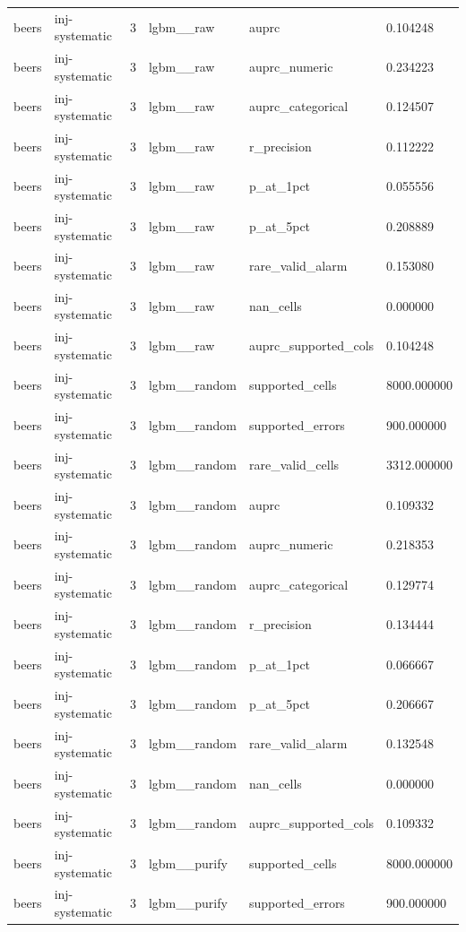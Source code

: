 \begin{tabular}{llllll}
beers & inj-systematic & 3 & lgbm\_\_raw & auprc & 0.104248 \\
beers & inj-systematic & 3 & lgbm\_\_raw & auprc\_numeric & 0.234223 \\
beers & inj-systematic & 3 & lgbm\_\_raw & auprc\_categorical & 0.124507 \\
beers & inj-systematic & 3 & lgbm\_\_raw & r\_precision & 0.112222 \\
beers & inj-systematic & 3 & lgbm\_\_raw & p\_at\_1pct & 0.055556 \\
beers & inj-systematic & 3 & lgbm\_\_raw & p\_at\_5pct & 0.208889 \\
beers & inj-systematic & 3 & lgbm\_\_raw & rare\_valid\_alarm & 0.153080 \\
beers & inj-systematic & 3 & lgbm\_\_raw & nan\_cells & 0.000000 \\
beers & inj-systematic & 3 & lgbm\_\_raw & auprc\_supported\_cols & 0.104248 \\
beers & inj-systematic & 3 & lgbm\_\_random & supported\_cells & 8000.000000 \\
beers & inj-systematic & 3 & lgbm\_\_random & supported\_errors & 900.000000 \\
beers & inj-systematic & 3 & lgbm\_\_random & rare\_valid\_cells & 3312.000000 \\
beers & inj-systematic & 3 & lgbm\_\_random & auprc & 0.109332 \\
beers & inj-systematic & 3 & lgbm\_\_random & auprc\_numeric & 0.218353 \\
beers & inj-systematic & 3 & lgbm\_\_random & auprc\_categorical & 0.129774 \\
beers & inj-systematic & 3 & lgbm\_\_random & r\_precision & 0.134444 \\
beers & inj-systematic & 3 & lgbm\_\_random & p\_at\_1pct & 0.066667 \\
beers & inj-systematic & 3 & lgbm\_\_random & p\_at\_5pct & 0.206667 \\
beers & inj-systematic & 3 & lgbm\_\_random & rare\_valid\_alarm & 0.132548 \\
beers & inj-systematic & 3 & lgbm\_\_random & nan\_cells & 0.000000 \\
beers & inj-systematic & 3 & lgbm\_\_random & auprc\_supported\_cols & 0.109332 \\
beers & inj-systematic & 3 & lgbm\_\_purify & supported\_cells & 8000.000000 \\
beers & inj-systematic & 3 & lgbm\_\_purify & supported\_errors & 900.000000 \\

\end{tabular}
